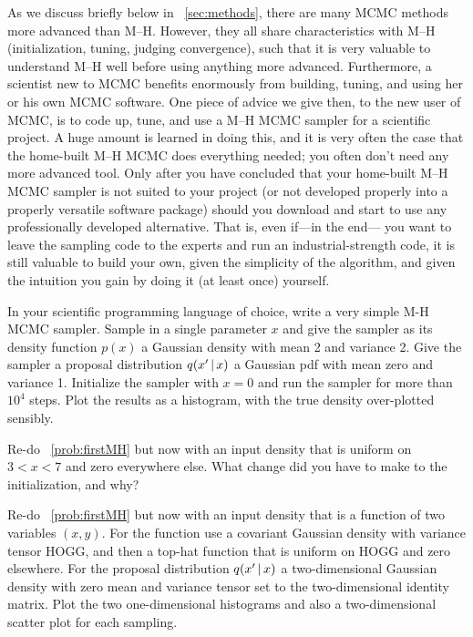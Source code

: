 \documentclass[12pt,twoside,pdftex]{article}
\begin{document}
As we discuss briefly below in \sectionname~\ref{sec:methods},
  there are many MCMC methods more advanced than M--H.
However, they all share characteristics with M--H
  (initialization, tuning, judging convergence),
  such that it is very valuable to understand M--H well before using anything more advanced.
Furthermore, a scientist new to MCMC benefits enormously from
  building, tuning, and using her or his own MCMC software.
One piece of advice we give then,
  to the new user of MCMC,
  is to code up, tune, and use a M--H MCMC sampler for a scientific project.
A huge amount is learned in doing this,
  and it is very often the case that the home-built M--H MCMC does everything needed;
  you often don't need any more advanced tool.
Only after you have concluded that your home-built M--H MCMC sampler
  is not suited to your project
  (or not developed properly into a properly versatile software package)
  should you download and start to use any professionally developed alternative.
That is, even if---in the end---%
  you want to leave the sampling code to the experts and run an industrial-strength code,
  it is still valuable to build your own,
  given the simplicity of the algorithm,
  and given the intuition you gain by doing it (at least once) yourself.

\begin{problem}\label{prob:firstMH}
In your scientific programming language of choice, write a very simple
M-H MCMC sampler.
Sample in a single parameter $x$ and give the sampler as its density
function $p(x)$ a Gaussian density with mean 2 and variance 2.
Give the sampler a proposal distribution $q(x'\,|\, x)$ a Gaussian
pdf with mean zero and variance 1.
Initialize the sampler with $x=0$ and run the sampler for more than $10^4$ steps.
Plot the results as a histogram, with the true density over-plotted sensibly.
\end{problem}

\begin{problem}
Re-do \problemname~\ref{prob:firstMH} but now with an input density
that is uniform on $3<x<7$ and zero everywhere else.
What change did you have to make to the initialization, and why?
\end{problem}

\begin{problem}\label{prob:twod}
Re-do \problemname~\ref{prob:firstMH} but now with an input density
that is a function of two variables $(x, y)$.
For the function use a covariant Gaussian density with variance tensor HOGG,
and then a top-hat function that is uniform on HOGG and zero elsewhere.
For the proposal distribution $q(x'\,|\, x)$ a two-dimensional Gaussian
density with zero mean and variance tensor set to the two-dimensional
identity matrix.
Plot the two one-dimensional histograms and also a two-dimensional scatter
plot for each sampling.
\end{problem}
\end{document}

